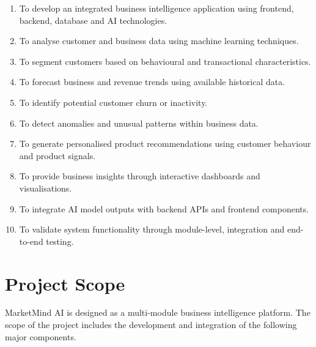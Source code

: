 \documentclass[12pt,a4paper]{report}
\begin{document}
\begin{enumerate}[leftmargin=1.2cm]

\item To develop an integrated business intelligence application using
frontend, backend, database and AI technologies.

\item To analyse customer and business data using machine learning
techniques.

\item To segment customers based on behavioural and transactional
characteristics.

\item To forecast business and revenue trends using available historical
data.

\item To identify potential customer churn or inactivity.

\item To detect anomalies and unusual patterns within business data.

\item To generate personalised product recommendations using customer
behaviour and product signals.

\item To provide business insights through interactive dashboards and
visualisations.

\item To integrate AI model outputs with backend APIs and frontend
components.

\item To validate system functionality through module-level, integration
and end-to-end testing.

\end{enumerate}



\section{Project Scope}

MarketMind AI is designed as a multi-module business intelligence
platform. The scope of the project includes the development and
integration of the following major components.
\end{document}
